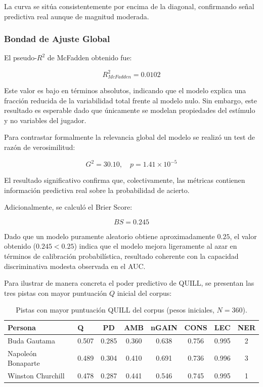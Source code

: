 \documentclass[../main.tex]{subfiles}
\begin{document}
La curva se sitúa consistentemente por encima de la diagonal, confirmando señal predictiva real aunque de magnitud moderada.

\subsubsection{Bondad de Ajuste Global}

El pseudo-$R^2$ de McFadden obtenido fue:

\[
R^2_{McFadden} = 0.0102
\]

Este valor es bajo en términos absolutos, indicando que el modelo explica una fracción reducida de la variabilidad total frente al modelo nulo. Sin embargo, este resultado es esperable dado que únicamente se modelan propiedades del estímulo y no variables del jugador.

Para contrastar formalmente la relevancia global del modelo se realizó un test de razón de verosimilitud:

\[
G^2 = 30.10, \quad p = 1.41 \times 10^{-5}
\]

El resultado significativo confirma que, colectivamente, las métricas contienen información predictiva real sobre la probabilidad de acierto.

Adicionalmente, se calculó el Brier Score:

\[
BS = 0.245
\]

Dado que un modelo puramente aleatorio obtiene aproximadamente $0.25$, el valor obtenido ($0.245 < 0.25$) indica que el modelo mejora ligeramente al azar en términos de calibración probabilística, resultado coherente con la capacidad discriminativa modesta observada en el AUC.

Para ilustrar de manera concreta el poder predictivo de QUILL, se presentan las tres pistas con mayor puntuación $Q$ inicial del corpus:

\begin{table}[H]
\centering
\small
\begin{tabular}{llcccccc}
\hline
\textbf{Persona} & \textbf{Q} & \textbf{PD} & \textbf{AMB} & \textbf{nGAIN} & \textbf{CONS} & \textbf{LEC} & \textbf{NER} \\
\hline
Buda Gautama     & 0.507 & 0.285 & 0.360 & 0.638 & 0.756 & 0.995 & 2 \\
Napoleón Bonaparte & 0.489 & 0.304 & 0.410 & 0.691 & 0.736 & 0.996 & 3 \\
Winston Churchill  & 0.478 & 0.287 & 0.441 & 0.546 & 0.745 & 0.995 & 1 \\
\hline
\end{tabular}
\caption{Pistas con mayor puntuación QUILL del corpus (pesos iniciales, $N=360$).}
\label{tab:top_hints}
\end{table}
\end{document}
